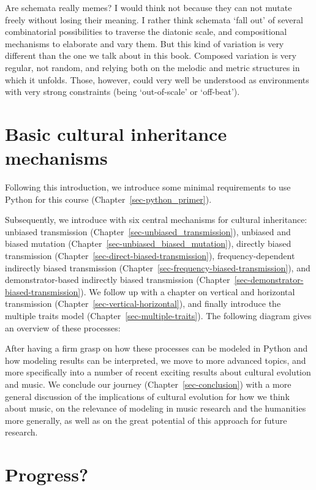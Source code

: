 \documentclass[
  a4paperpaper,
  ,captions=tableheading
]{scrbook}
\begin{document}
Are schemata really memes? I would think not because they can not mutate
freely without losing their meaning. I rather think schemata `fall out'
of several combinatorial possibilities to traverse the diatonic scale,
and compositional mechanisms to elaborate and vary them. But this kind
of variation is very different than the one we talk about in this book.
Composed variation is very regular, not random, and relying both on the
melodic and metric structures in which it unfolds. Those, however, could
very well be understood as environments with very strong constraints
(being `out-of-scale' or `off-beat').

\hypertarget{basic-cultural-inheritance-mechanisms}{%
\section{Basic cultural inheritance
mechanisms}\label{basic-cultural-inheritance-mechanisms}}

Following this introduction, we introduce some minimal requirements to
use Python for this course (Chapter~\ref{sec-python_primer}).

Subsequently, we introduce with six central mechanisms for cultural
inheritance: unbiased transmission
(Chapter~\ref{sec-unbiased_transmission}), unbiased and biased mutation
(Chapter~\ref{sec-unbiased_biased_mutation}), directly biased
transmission (Chapter~\ref{sec-direct-biased-transmission}),
frequency-dependent indirectly biased transmission
(Chapter~\ref{sec-frequency-biased-transmission}), and
demonstrator-based indirectly biased transmission
(Chapter~\ref{sec-demonstrator-biased-transmission}). We follow up with
a chapter on vertical and horizontal transmission
(Chapter~\ref{sec-vertical-horizontal}), and finally introduce the
multiple traits model (Chapter~\ref{sec-multiple-traits}). The following
diagram gives an overview of these processes:

After having a firm grasp on how these processes can be modeled in
Python and how modeling results can be interpreted, we move to more
advanced topics, and more specifically into a number of recent exciting
results about cultural evolution and music. We conclude our journey
(Chapter~\ref{sec-conclusion}) with a more general discussion of the
implications of cultural evolution for how we think about music, on the
relevance of modeling in music research and the humanities more
generally, as well as on the great potential of this approach for future
research.

\hypertarget{progress}{%
\section{Progress?}\label{progress}}
\end{document}
